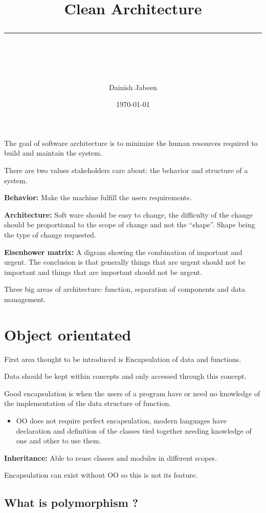 \documentclass[11pt]{scrartcl} %
\title{	
	\normalfont\normalsize
	\vspace{20pt} %
	{\huge Clean Architecture}\\ %
	\vspace{12pt} %
	\rule{\linewidth}{2pt}\\ %
}
\author{\small Dainish Jabeen} %
\date{\normalsize\today} %
\begin{document}
\maketitle %

The goal of software architecture is to minimize the human resources
required to build and maintain the system.

There are two values stakeholders care about: the behavior and structure
of a system.

\textbf{Behavior:} Make the machine fulfill the users requirements.

\textbf{Architecture:} Soft ware should be easy to change, the
difficulty of the change should be proportional to the scope of change
and not the ``shape''. Shape being the type of change requested.

\textbf{Eisenhower matrix:} A digram showing the combination of
important and urgent. The conclusion is that generally things that are
urgent should not be important and things that are important should not
be urgent.

Three big areas of architecture: function, separation of components and
data management.

\section{Object orientated}

First area thought to be introduced is Encapsulation of data and
functions.

Data should be kept within concepts and only accessed through this
concept.

Good encapsulation is when the users of a program have or need no
knowledge of the implementation of the data structure of function.

\begin{itemize}
\item
  OO does not require perfect encapsulation, modern languages have
  declaration and definition of the classes tied together needing
  knowledge of one and other to use them.
\end{itemize}

\textbf{Inheritance:} Able to reuse classes and modules in different
scopes.

Encapsulation can exist without OO so this is not its feature.

\subsection{What is polymorphism ?}
\end{document}
